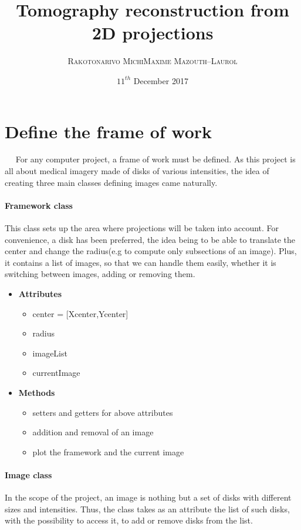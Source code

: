 \documentclass[a4,12pt]{article}
\title{\textbf{Tomography reconstruction from 2D projections}}
\author{
\begin{tabular}{cc}
	\textsc{Rakotonarivo Michi} & \textsc{Maxime Mazouth--Laurol}
\end{tabular}}
\date{\small $11^{th}$ December 2017}
\begin{document}
\maketitle
\section{Define the frame of work}
~~ For any computer project, a frame of work must be defined. As this project is all about medical imagery made of disks of various intensities, the idea of creating three main classes defining images came naturally. 
\paragraph{Framework class} 
This class sets up the area where projections will be taken into account. For convenience, a disk has been preferred, the idea being to be able to translate the center and change the radius(e.g to compute only subsections of an image). Plus, it contains a list of images, so that we can handle them easily, whether it is switching between images, adding or removing them.
\begin{itemize}
\item \textbf{Attributes}
	\begin{itemize}
	\item center = [Xcenter,Ycenter]
	\item radius
	\item imageList
	\item currentImage
	\end{itemize}
	
\item \textbf{Methods}
	\begin{itemize}
	\item setters and getters for above attributes
	\item addition and removal of an image
	\item plot the framework and the current image
	\end{itemize}
\end{itemize}

\paragraph{Image class}
In the scope of the project, an image is nothing but a set of disks with different sizes and intensities. Thus, the class takes as an attribute the list of such disks, with the possibility to access it, to add or remove disks from the list.
\end{document}

